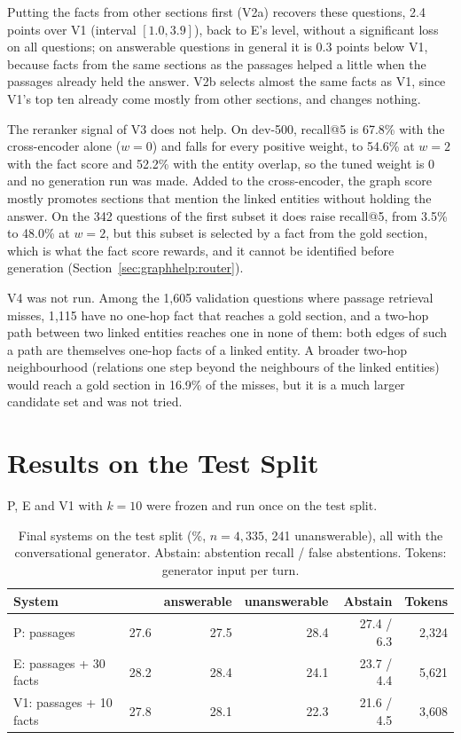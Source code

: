 Putting the facts from other sections first (V2a) recovers these questions, 2.4 points
over V1 (interval $[1.0, 3.9]$), back to E's level, without a significant loss on all
questions; on answerable questions in general it is 0.3 points below V1, because facts from
the same sections as the passages helped a little when the passages already held the
answer. V2b selects almost the same facts as V1, since V1's top ten already come mostly from
other sections, and changes nothing.

The reranker signal of V3 does not help. On dev-500, recall@5 is 67.8\% with the
cross-encoder alone ($w = 0$) and falls for every positive weight, to 54.6\% at $w = 2$ with
the fact score and 52.2\% with the entity overlap, so the tuned weight is 0 and no generation
run was made. Added to the cross-encoder, the graph score mostly promotes sections that
mention the linked entities without holding the answer. On the 342 questions of the first
subset it does raise recall@5, from 3.5\% to 48.0\% at $w = 2$, but this subset is selected by
a fact from the gold section, which is what the fact score rewards, and it cannot be
identified before generation (Section~\ref{sec:graphhelp:router}).

V4 was not run. Among the 1{,}605 validation questions where passage retrieval misses, 1{,}115
have no one-hop fact that reaches a gold section, and a two-hop path between two linked
entities reaches one in none of them: both edges of such a path are themselves one-hop facts
of a linked entity. A broader two-hop neighbourhood (relations one step beyond the
neighbours of the linked entities) would reach a gold section in 16.9\% of the misses, but it
is a much larger candidate set and was not tried.


\section{Results on the Test Split}\label{sec:graphrag:test}

P, E and V1 with $k = 10$ were frozen and run once on the test split.

\begin{table}[ht]
    \centering
    \caption{Final systems on the test split (\%, $n = 4{,}335$, 241 unanswerable), all with
    the conversational generator. Abstain: abstention recall / false abstentions. Tokens:
    generator input per turn.}
    \label{tab:graphrag:test}
    \small
    \begin{tabular}{lrrrrr}
        \toprule
        System & \fone{} & answerable & unanswerable & Abstain & Tokens \\
        \midrule
        P: passages             & 27.6 & 27.5 & 28.4 & 27.4 / 6.3 & 2{,}324 \\
        E: passages + 30 facts  & 28.2 & 28.4 & 24.1 & 23.7 / 4.4 & 5{,}621 \\
        V1: passages + 10 facts & 27.8 & 28.1 & 22.3 & 21.6 / 4.5 & 3{,}608 \\
        \bottomrule
    \end{tabular}
\end{table}

